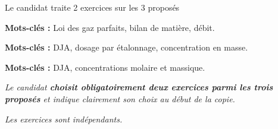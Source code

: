 \newpage
\vAligne{-50pt}

\begin{boite}
  \centering
  Le candidat traite  2 exercices sur les 3 proposés

  \begin{multicols}{3}
    \begin{boite}
      \begin{center}
      \end{center}
      \vspace*{-12pt}
      \textbf{Mots-clés :} Loi des gaz parfaits, bilan de matière, débit.
    \end{boite}
    \begin{boite}
      \begin{center}
      \end{center}
      \vspace*{-12pt}
      \textbf{Mots-clés :} DJA, dosage par étalonnage, concentration en masse.
    \end{boite}
    \begin{boite}
      \begin{center}
      \end{center}
      \vspace*{-12pt}
      \textbf{Mots-clés :} DJA, concentrations molaire et massique.
    \end{boite}
  \end{multicols}
\end{boite}

\textit{
  Le candidat \textbf{choisit obligatoirement deux exercices parmi les trois proposés} et indique clairement son choix au début de la copie.
}
  
\textit{
  Les exercices sont indépendants.
}
\vspace*{24pt}


\vspace*{-4pt}



\vspace*{24pt}



\pasCorrection{\newpage}
\correction{\vspace*{24pt}}
